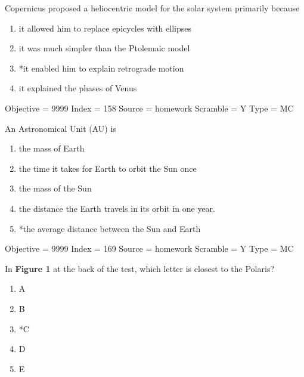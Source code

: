 \documentclass[11pt]{article}
\begin{document}
\begin{enumerate}
\begin{minipage}{\textwidth}
\begin{minipage}{\textwidth}
\item Copernicus proposed a heliocentric model for the solar system primarily because \underline{\hspace{0.5in}}
\begin{enumerate} 
\setlength{\itemsep}{1pt} 
\setlength{\parskip}{0pt} 
\setlength{\parsep}{0pt}
\setlength{\multicolsep}{1pt} 
\item it allowed him to replace epicycles with ellipses
\item it was much simpler than the Ptolemaic model
\item *it enabled him to explain retrograde motion
\item it explained the phases of Venus
\end{enumerate} 
Objective = 9999
Index = 158
Source = homework
Scramble = Y
Type = MC
\end{minipage}
\end{minipage}
\vskip 0.20in

\begin{minipage}{\textwidth}
\begin{minipage}{\textwidth}
\item An Astronomical Unit (AU) is \underline{\hspace{0.5in}}
\begin{enumerate} 
\setlength{\itemsep}{1pt} 
\setlength{\parskip}{0pt} 
\setlength{\parsep}{0pt}
\setlength{\multicolsep}{1pt} 
\item the mass of Earth
\item the time it takes for Earth to orbit the Sun once
\item the mass of the Sun
\item the distance the Earth travels in its orbit in one year.
\item *the average distance between the Sun and Earth
\end{enumerate} 
Objective = 9999
Index = 169
Source = homework
Scramble = Y
Type = MC
\end{minipage}
\end{minipage}
\vskip 0.20in

\begin{minipage}{\textwidth}
\begin{minipage}{\textwidth}
\item In {\bf Figure 1} at the back of the test, which letter is closest to the Polaris?
\begin{multicols}{3}
\begin{enumerate} 
\setlength{\itemsep}{1pt} 
\setlength{\parskip}{0pt} 
\setlength{\parsep}{0pt}
\setlength{\multicolsep}{1pt} 
\item A
\item B
\item *C
\item D
\item E
\end{enumerate} 
\vfill 
\end{multicols}


\end{minipage}
\end{minipage}
\end{enumerate}
\end{document}
